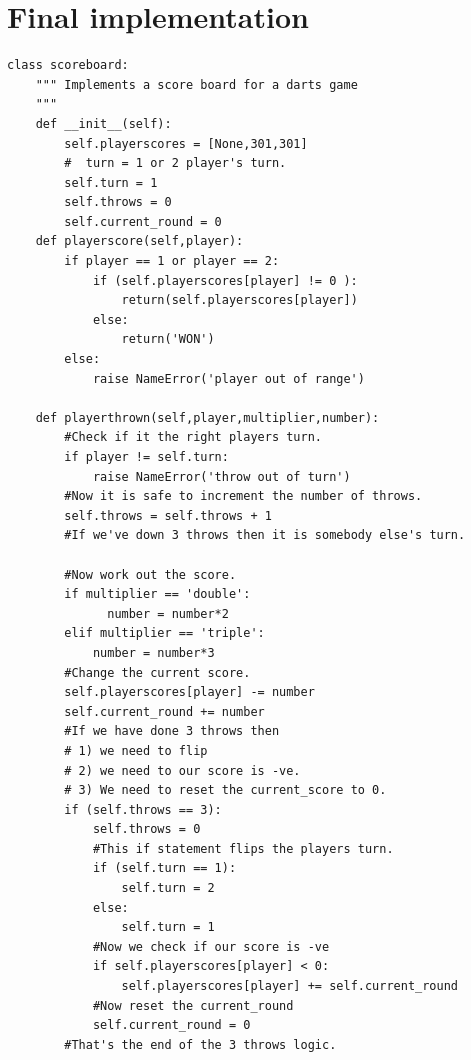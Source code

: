 \documentclass{paper}
\begin{document}
\section{Final implementation}
\begin{lstlisting}
class scoreboard:
    """ Implements a score board for a darts game
    """
    def __init__(self):
        self.playerscores = [None,301,301]
        #  turn = 1 or 2 player's turn.    
        self.turn = 1
        self.throws = 0
        self.current_round = 0
    def playerscore(self,player):
        if player == 1 or player == 2:
            if (self.playerscores[player] != 0 ): 
                return(self.playerscores[player])
            else:
                return('WON')
        else:
            raise NameError('player out of range')

    def playerthrown(self,player,multiplier,number):
        #Check if it the right players turn.
        if player != self.turn:
            raise NameError('throw out of turn')
        #Now it is safe to increment the number of throws.
        self.throws = self.throws + 1
        #If we've down 3 throws then it is somebody else's turn.

        #Now work out the score.
        if multiplier == 'double':
              number = number*2
        elif multiplier == 'triple':
            number = number*3
        #Change the current score.
        self.playerscores[player] -= number
        self.current_round += number
        #If we have done 3 throws then
        # 1) we need to flip
        # 2) we need to our score is -ve.
        # 3) We need to reset the current_score to 0.
        if (self.throws == 3):
            self.throws = 0
            #This if statement flips the players turn.
            if (self.turn == 1):
                self.turn = 2
            else:
                self.turn = 1
            #Now we check if our score is -ve
            if self.playerscores[player] < 0:
                self.playerscores[player] += self.current_round
            #Now reset the current_round
            self.current_round = 0
        #That's the end of the 3 throws logic.


    


\end{lstlisting}
\end{document}
